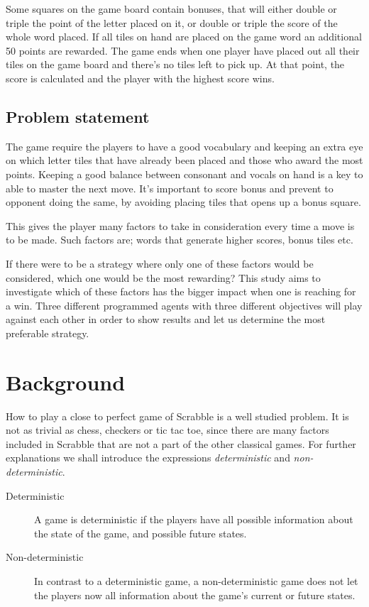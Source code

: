 \documentclass[a4paper, 12pt]{report}
\begin{document}
Some squares on the game board contain bonuses, that will either double or triple the point of the letter placed on it, or double or triple the score of the whole word placed. If all tiles on hand are placed on the game word an additional 50 points are rewarded. The game ends when one player have placed out all their tiles on the game board and there’s no tiles left to pick up. At that point, the score is calculated and the player with the highest score wins.

\section{Problem statement}
The game require the players to have a good vocabulary and keeping an extra eye on which letter tiles that have already been placed and those who award the most points. Keeping a good balance between consonant and vocals on hand is a key to able to master the next move. It’s important to score bonus and prevent to opponent doing the same, by avoiding placing tiles that opens up a bonus square.

This gives the player many factors to take in consideration every time a move is to be made. Such factors are; words that generate higher scores, bonus tiles etc.

If there were to be a strategy where only one of these factors would be considered, which one would be the most rewarding? This study aims to investigate which of these factors has the bigger impact when one is reaching for a win. Three different programmed agents with three different objectives will play against each other in order to show results and let us determine the most preferable strategy.


\chapter{Background}
How to play a close to perfect game of Scrabble is a well studied problem. It is not as trivial as chess, checkers or tic tac toe, since there are many factors included in Scrabble that are not a part of the other classical games. For further explanations we shall introduce the expressions \emph{deterministic} and \emph{non-deterministic}. 

\begin{description}
\item[Deterministic] A game is deterministic if the players have all possible information about the state of the game, and possible future states.
\item[Non-deterministic] In contrast to a deterministic game, a non-deterministic game does not let the players now all information about the game's current or future states.
\end{description}
\end{document}
